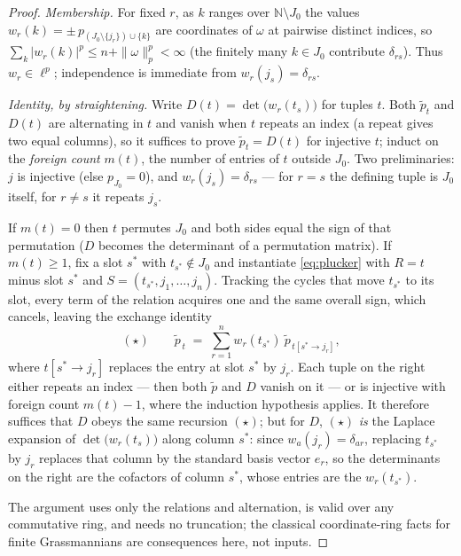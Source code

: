\documentclass[11pt]{amsart}
\theoremstyle{definition}
\newcommand{\N}{\mathbb{N}}
\begin{document}
\begin{proof}
\emph{Membership.} For fixed $r$, as $k$ ranges over $\N\setminus J_0$ the values $w_r(k)=\pm\,p_{(J_0\setminus\{j_r\})\cup\{k\}}$ are coordinates of $\omega$ at pairwise distinct indices, so $\sum_{k}|w_r(k)|^p\le n+\|\omega\|_p^p<\infty$ (the finitely many $k\in J_0$ contribute $\delta_{rs}$). Thus $w_r\in\ell^p$; independence is immediate from $w_r(j_s)=\delta_{rs}$.

\emph{Identity, by straightening.} Write $D(t)=\det\big(w_r(t_s)\big)$ for tuples $t$. Both $\tilde p_t$ and $D(t)$ are alternating in $t$ and vanish when $t$ repeats an index (a repeat gives two equal columns), so it suffices to prove $\tilde p_t=D(t)$ for injective $t$; induct on the \emph{foreign count} $m(t)$, the number of entries of $t$ outside $J_0$. Two preliminaries: $j$ is injective (else $p_{J_0}=0$), and $w_r(j_s)=\delta_{rs}$ --- for $r=s$ the defining tuple is $J_0$ itself, for $r\ne s$ it repeats $j_s$.

If $m(t)=0$ then $t$ permutes $J_0$ and both sides equal the sign of that permutation ($D$ becomes the determinant of a permutation matrix). If $m(t)\ge1$, fix a slot $s^*$ with $t_{s^*}\notin J_0$ and instantiate \eqref{eq:plucker} with $R=t$ minus slot $s^*$ and $S=(t_{s^*},j_1,\dots,j_n)$. Tracking the cycles that move $t_{s^*}$ to its slot, every term of the relation acquires one and the same overall sign, which cancels, leaving the exchange identity
\[
(\star)\qquad \tilde p_{\,t}\;=\;\sum_{r=1}^{n} w_r(t_{s^*})\ \tilde p_{\,t[s^*\!\to j_r]},
\]
where $t[s^*\!\to j_r]$ replaces the entry at slot $s^*$ by $j_r$. Each tuple on the right either repeats an index --- then both $\tilde p$ and $D$ vanish on it --- or is injective with foreign count $m(t)-1$, where the induction hypothesis applies. It therefore suffices that $D$ obeys the same recursion $(\star)$; but for $D$, $(\star)$ \emph{is} the Laplace expansion of $\det\big(w_r(t_s)\big)$ along column $s^*$: since $w_a(j_r)=\delta_{ar}$, replacing $t_{s^*}$ by $j_r$ replaces that column by the standard basis vector $e_r$, so the determinants on the right are the cofactors of column $s^*$, whose entries are the $w_r(t_{s^*})$.

The argument uses only the relations and alternation, is valid over any commutative ring, and needs no truncation; the classical coordinate-ring facts for finite Grassmannians \cite[\S9]{Fulton} are consequences here, not inputs.
\end{proof}
\end{document}
